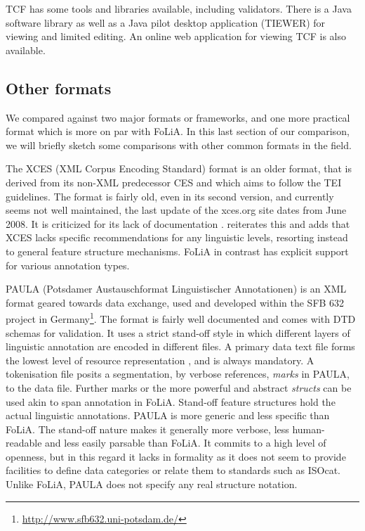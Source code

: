 \documentclass[a4paper,10pt,twoside]{article}
\begin{document}
TCF has some tools and libraries available, including validators. There is a
Java software library as well as a Java pilot desktop application (TIEWER) for
viewing and limited editing. An online web application for viewing TCF is also
available.


\subsection{Other formats}

We compared against two major formats or frameworks, and one more practical format which is
more on par with FoLiA. In this last section of our comparison, we will briefly
sketch some comparisons with other common formats in the field.

The XCES (XML Corpus Encoding Standard) format is an older format, that is
derived from its non-XML predecessor CES \cite{XCES} and which aims to follow
the TEI guidelines. The format is fairly old, even in its second version, and
currently seems not well maintained, the last update of the xces.org site dates
from June 2008. It is criticized for its lack of documentation
\cite{TEICORPUSANNOT}.   reiterates this and adds that XCES
lacks specific recommendations for any linguistic levels, resorting instead to
general feature structure mechanisms.  FoLiA in contrast has explicit support
for various annotation types.

PAULA (Potsdamer Austauschformat Linguistischer Annotationen) is an XML format geared towards data exchange, used and developed within the SFB 632 project in Germany\footnote{\url{http://www.sfb632.uni-potsdam.de/}}. The format is fairly well documented and comes with DTD schemas for validation. It uses a strict stand-off style in which different layers of linguistic annotation are encoded in different files. A primary data text file forms the lowest level of resource representation \cite{PAULA}, and is always mandatory. A tokenisation file posits a segmentation, by verbose references, \emph{marks} in PAULA, to the
data file. Further marks or the more powerful and abstract \emph{structs} can
be used akin to span annotation in FoLiA.  Stand-off feature structures hold
the actual linguistic annotations. PAULA is more generic and less specific than
FoLiA. The stand-off nature makes it generally more verbose, less
human-readable and less easily parsable than FoLiA. It commits to a high level
of openness, but in this regard it lacks in formality as it does not seem to
provide facilities to define data categories or relate them to standards such
as ISOcat.  Unlike FoLiA, PAULA does not specify any real structure notation.
\end{document}
